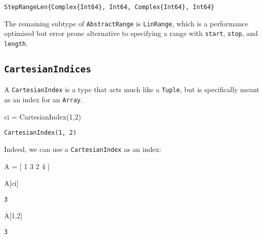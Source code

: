 \documentclass[
  letterpaper,
  DIV=11,
  numbers=noendperiod]{scrreprt}
\newenvironment{Shaded}{\begin{snugshade}}{\end{snugshade}}
\newcommand{\FloatTok}[1]{\textcolor[rgb]{0.68,0.00,0.00}{#1}}
\newcommand{\FunctionTok}[1]{\textcolor[rgb]{0.28,0.35,0.67}{#1}}
\newcommand{\NormalTok}[1]{\textcolor[rgb]{0.00,0.23,0.31}{#1}}
\newcommand{\OperatorTok}[1]{\textcolor[rgb]{0.37,0.37,0.37}{#1}}
\begin{document}
\begin{verbatim}
StepRangeLen{Complex{Int64}, Int64, Complex{Int64}, Int64}
\end{verbatim}

The remaining subtype of \texttt{AbstractRange} is \texttt{LinRange},
which is a performance optimised but error prone alternative to
specifying a range with \texttt{start}, \texttt{stop}, and
\texttt{length}.

\hypertarget{cartesianindices}{%
\subsection{\texorpdfstring{\texttt{CartesianIndices}}{CartesianIndices}}\label{cartesianindices}}

A \texttt{CartesianIndex} is a type that acts much like a
\texttt{Tuple}, but is specifically meant as an index for an
\texttt{Array}.

\begin{Shaded}
\begin{Highlighting}[]
\NormalTok{ci }\OperatorTok{=} \FunctionTok{CartesianIndex}\NormalTok{(}\FloatTok{1}\NormalTok{,}\FloatTok{2}\NormalTok{)}
\end{Highlighting}
\end{Shaded}

\begin{verbatim}
CartesianIndex(1, 2)
\end{verbatim}

Indeed, we can use a \texttt{CartesianIndex} as an index:

\begin{Shaded}
\begin{Highlighting}[]
\NormalTok{A }\OperatorTok{=}\NormalTok{ [ }\FloatTok{1} \FloatTok{3}
      \FloatTok{2} \FloatTok{4}\NormalTok{ ]}

\NormalTok{A[ci]}
\end{Highlighting}
\end{Shaded}

\begin{verbatim}
3
\end{verbatim}

\begin{Shaded}
\begin{Highlighting}[]
\NormalTok{A[}\FloatTok{1}\NormalTok{,}\FloatTok{2}\NormalTok{]}
\end{Highlighting}
\end{Shaded}

\begin{verbatim}
3
\end{verbatim}
\end{document}
